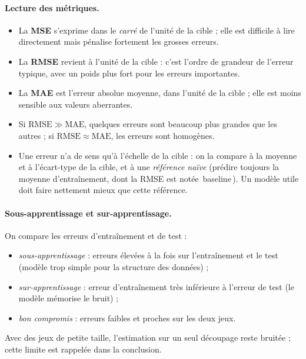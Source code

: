 \documentclass[11pt,a4paper]{report}
\begin{document}
\paragraph{Lecture des m\'etriques.}
\begin{itemize}
  \item La \textbf{MSE} s'exprime dans le \emph{carr\'e} de l'unit\'e de la cible ; elle
        est difficile \`a lire directement mais p\'enalise fortement les grosses erreurs.
  \item La \textbf{RMSE} revient \`a l'unit\'e de la cible : c'est l'ordre de grandeur de
        l'erreur typique, avec un poids plus fort pour les erreurs importantes.
  \item La \textbf{MAE} est l'erreur absolue moyenne, dans l'unit\'e de la cible ; elle est
        moins sensible aux valeurs aberrantes.
  \item Si $\mathrm{RMSE}\gg\mathrm{MAE}$, quelques erreurs sont beaucoup plus grandes
        que les autres ; si $\mathrm{RMSE}\approx\mathrm{MAE}$, les erreurs sont homog\`enes.
  \item Une erreur n'a de sens qu'\`a l'\'echelle de la cible : on la compare \`a la
        moyenne et \`a l'\'ecart-type de la cible, et \`a une \emph{r\'ef\'erence na\"ive}
        (pr\'edire toujours la moyenne d'entra\^inement, dont la RMSE est not\'ee
        \guillemotleft\,baseline\,\guillemotright{}). Un mod\`ele utile doit faire nettement mieux que cette r\'ef\'erence.
\end{itemize}

\paragraph{Sous-apprentissage et sur-apprentissage.} On compare les erreurs
d'entra\^inement et de test :
\begin{itemize}
  \item \emph{sous-apprentissage} : erreurs \'elev\'ees \`a la fois sur l'entra\^inement et le
        test (mod\`ele trop simple pour la structure des donn\'ees) ;
  \item \emph{sur-apprentissage} : erreur d'entra\^inement tr\`es inf\'erieure \`a l'erreur de
        test (le mod\`ele m\'emorise le bruit) ;
  \item \emph{bon compromis} : erreurs faibles et proches sur les deux jeux.
\end{itemize}
Avec des jeux de petite taille, l'estimation sur un seul d\'ecoupage reste bruit\'ee ;
cette limite est rappel\'ee dans la conclusion.
\end{document}
